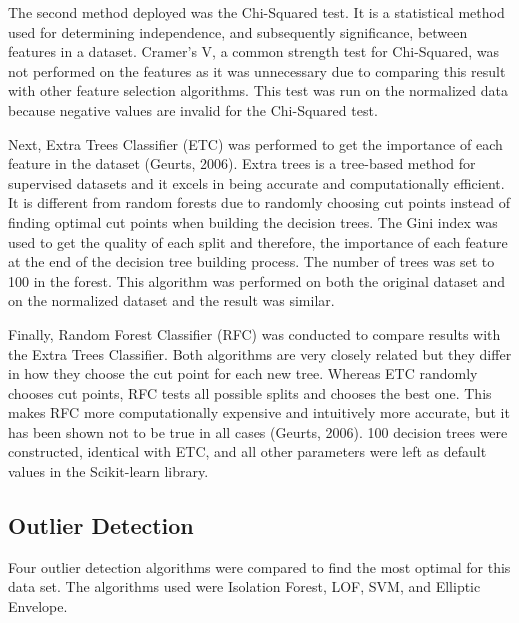 \documentclass[letterpaper, 12 pt, conference]{ieeeconf}  %
\begin{document}
The second method deployed was the Chi-Squared test. It is a statistical method used for determining independence, and subsequently significance, between features in a dataset. Cramer’s V, a common strength test for Chi-Squared, was not performed on the features as it was unnecessary due to comparing this result with other feature selection algorithms. This test was run on the normalized data because negative values are invalid for the Chi-Squared test.
        
Next, Extra Trees Classifier (ETC) was performed to get the importance of each feature in the dataset (Geurts, 2006). Extra trees is a tree-based method for supervised datasets and it excels in being accurate and computationally efficient. It is different from random forests due to randomly choosing cut points instead of finding optimal cut points when building the decision trees. The Gini index was used to get the quality of each split and therefore, the importance of each feature at the end of the decision tree building process. The number of trees was set to 100 in the forest. This algorithm was performed on both the original dataset and on the normalized dataset and the result was similar.
        
Finally, Random Forest Classifier (RFC) was conducted to compare results with the Extra Trees Classifier. Both algorithms are very closely related but they differ in how they choose the cut point for each new tree. Whereas ETC randomly chooses cut points, RFC tests all possible splits and chooses the best one. This makes RFC more computationally expensive and intuitively more accurate, but it has been shown not to be true in all cases (Geurts, 2006). 100 decision trees were constructed, identical with ETC, and all other parameters were left as default values in the Scikit-learn library.



\subsection{Outlier Detection}

Four outlier detection algorithms were compared to find the most optimal for this data set. The algorithms used were Isolation Forest, LOF, SVM, and Elliptic Envelope.
        
\end{document}
